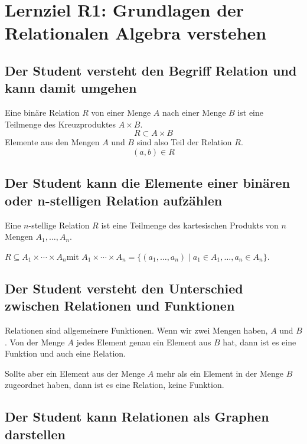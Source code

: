\section{Lernziel R1: Grundlagen der Relationalen Algebra verstehen}

\subsection{Der Student versteht den Begriff Relation und kann damit umgehen}
Eine binäre Relation \(R\) von einer Menge \(A\) nach einer Menge \(B\) ist eine Teilmenge des Kreuzproduktes \(A \times B\).
\begin{equation*}
    R \subset A \times B
\end{equation*}
Elemente aus den Mengen \(A\) und \(B\) sind also Teil der Relation \(R\).
\begin{equation*}
  (a,b)\in R
\end{equation*}


\subsection{Der Student kann die Elemente einer binären oder n-stelligen Relation aufzählen}
Eine \(n\)-stellige Relation \(R\) ist eine Teilmenge des kartesischen Produkts von \(n\) Mengen \(A_{1}, \dotsc, A_{n}\).


\( R \subseteq A_{1} \times \dotsb \times A_{n}\)mit \(A_1 \times \dotsb \times A_n = \{(a_1, \dotsc, a_n) \mid a_1 \in A_1, \dotsc, a_n \in A_n\}\).

\subsection{Der Student versteht den Unterschied zwischen Relationen und Funktionen}
Relationen sind allgemeinere Funktionen. Wenn wir zwei Mengen haben, \(A\) und \(B\). Von der Menge \(A\) jedes Element genau ein Element aus \(B\) hat, dann ist es eine Funktion und auch eine Relation. 


Sollte aber ein Element aus der Menge \(A\) mehr als ein Element in der Menge \(B\) zugeordnet haben, dann ist es eine Relation, keine Funktion.


\subsection{Der Student kann Relationen als Graphen darstellen}


